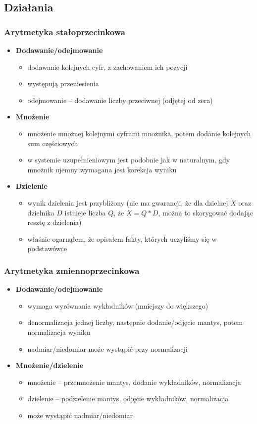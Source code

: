 \subsection{Działania}
\subsubsection{Arytmetyka stałoprzecinkowa}
\begin{itemize}
\item \textbf{Dodawanie/odejmowanie}
	\begin{itemize}
	\item dodawanie kolejnych cyfr, z zachowaniem ich pozycji
	\item występują przeniesienia
	\item odejmowanie -- dodawanie liczby przeciwnej (odjętej od zera)
	\end{itemize}
\item \textbf{Mnożenie}
	\begin{itemize}
	\item mnożenie mnożnej kolejnymi cyframi mnożnika, potem dodanie kolejnych sum częściowych
	\item w systemie uzupełnieniowym jest podobnie jak w naturalnym, gdy mnożnik ujemny wymagana jest korekcja wyniku
	\end{itemize}
\item \textbf{Dzielenie}
	\begin{itemize}
	\item wynik dzielenia jest przybliżony (nie ma gwarancji, że dla dzielnej $X$ oraz dzielnika $D$ istnieje liczba $Q$, że $X = Q * D$, można to skorygować dodając resztę z dzielenia)
	\item właśnie ogarnąłem, że opisałem fakty, których uczyliśmy się w podstawówce
	\end{itemize}
\end{itemize}

\subsubsection{Arytmetyka zmiennoprzecinkowa}
\begin{itemize}
\item \textbf{Dodawanie/odejmowanie}
	\begin{itemize}
	\item wymaga wyrównania wykładników (mniejszy do większego)
	\item denormalizacja jednej liczby, następnie dodanie/odjęcie mantys, potem normalizacja wyniku
	\item nadmiar/niedomiar może wystąpić przy normalizacji
	\end{itemize}
\item \textbf{Mnożenie/dzielenie}
	\begin{itemize}
	\item mnożenie -- przemnożenie mantys, dodanie wykładników, normalizacja
	\item dzielenie -- podzielenie mantys, odjęcie wykładników, normalizacja
	\item może wystąpić nadmiar/niedomiar
	\end{itemize}
\end{itemize}

